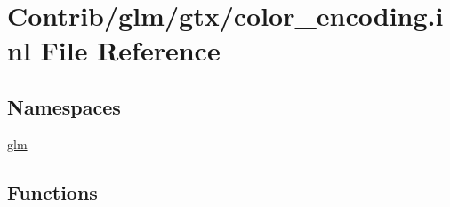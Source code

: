 \hypertarget{color__encoding_8inl}{}\section{Contrib/glm/gtx/color\+\_\+encoding.inl File Reference}
\label{color__encoding_8inl}
\subsection*{Namespaces}
\begin{DoxyCompactItemize}
\item 
 \mbox{\hyperlink{namespaceglm}{glm}}
\end{DoxyCompactItemize}
\subsection*{Functions}
